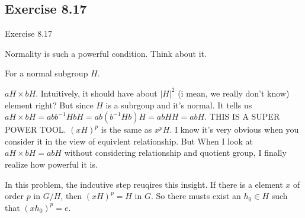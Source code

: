 \documentclass[15pt]{scrartcl}
\begin{document}
\subsection{Exercise 8.17}
\begin{discussion*}Exercise 8.17
    \begin{abboy*}
        Normality is such a powerful condition. Think about it. 

        For a normal subgroup $H$. 

        $aH \times bH$. Intuitively, it should have about $|H|^2$ (i mean, we really don't know) element right? But since $H$ is a subrgoup and it's normal. It tells us $aH \times bH = abb^{-1}HbH=ab (b^{-1}Hb) H=abHH =abH$. THIS IS A SUPER POWER TOOL. $(xH)^p$ is the same as $x^pH$. I know it's very obvious when you consider it in the view of equivlent relationship.  But When I look at $aH \times bH = abH$ without considering relationship and quotient group, I finally realize how powerful it is. 

        In this problem, the indcutive step reuqires this insight. If there is a element $x$ of order $p$ in $G/H$, then $(xH)^p = H$ in $G$. So there musts exist an $h_0\in H$ such that $(xh_0)^p=e$.
    \end{abboy*}
\end{discussion*}
\end{document}
